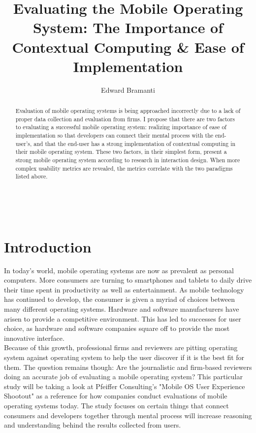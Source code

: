 \documentclass[11pt]{article}
\title{Evaluating the Mobile Operating System: The Importance of Contextual Computing \& Ease of Implementation}
\author{Edward Bramanti}
\begin{document}
\maketitle\
\begin{abstract}
Evaluation of mobile operating systems is being approached incorrectly due to a lack of proper data collection and evaluation from firms. I propose that there are two factors to evaluating a successful mobile operating system: realizing importance of ease of implementation so that developers can connect their mental process with the end-user's, and that the end-user has a strong implementation of contextual computing in their mobile operating system. These two factors, in their simplest form, present a strong mobile operating system according to research in interaction design. When more complex usability metrics are revealed, the metrics correlate with the two paradigms listed above.
\end{abstract}
\pagebreak
\section{Introduction}
In today's world, mobile operating systems are now as prevalent as personal computers. More consumers are turning to smartphones and tablets to daily drive their time spent in productivity as well as entertainment. As mobile technology has continued to develop, the consumer is given a myriad of choices between many different operating systems. Hardware and software manufacturers have arisen to provide a competitive environment. This has led to successes for user choice, as hardware and software companies square off to provide the most innovative interface.\\
\indent Because of this growth, professional firms and reviewers are pitting operating system against operating system to help the user discover if it is the best fit for them. The question remains though: Are the journalistic and firm-based reviewers doing an accurate job of evaluating a mobile operating system? This particular study will be taking a look at Pfeiffer Consulting's "Mobile OS User Experience Shootout" as a reference for how companies conduct evaluations of mobile operating systems today. The study focuses on certain things that connect consumers and developers together through mental process will increase reasoning and understanding behind the results collected from users.
\end{document}
